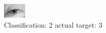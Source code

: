 \begin{figure}[h!]
\begin{center}
\includegraphics[width=0.60\columnwidth]{figures/ID2862_class_2_target_3.png}
\end{center}
\caption{ Classification: 2 actual target: 3}
\label{fig:ID2862_class_2_target_3}
\end{figure}
